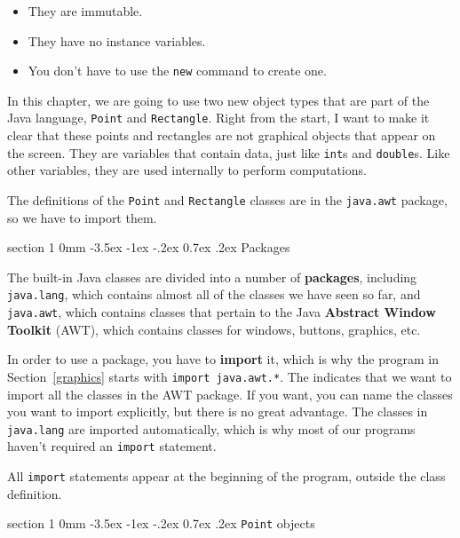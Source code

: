 \documentclass{book}
\makeatletter
\renewcommand{\section}{\@startsection 
    {section} {1} {0mm}%
    {-3.5ex \@plus -1ex \@minus -.2ex}%
    {0.7ex \@plus.2ex}%
    {\normalfont\Large\bfseries}}
\makeatother
\begin{document}
\begin{itemize}

\item They are immutable.

\item They have no instance variables.

\item You don't have to use the {\tt new} command to create one.

\end{itemize}

In this chapter, we are going to use two new object types that are
part of the Java language, {\tt Point} and {\tt Rectangle}.
Right from the start, I want to make it clear that these points
and rectangles are not graphical objects that appear on the
screen.  They are variables that contain data, just like {\tt int}s
and {\tt double}s.  Like other variables, they are used internally
to perform computations.

The definitions of the {\tt Point} and {\tt Rectangle} classes are
in the {\tt java.awt} package, so we have to import them.

\section{Packages}

The built-in Java classes are divided into a number of {\bf
packages}, including {\tt java.lang}, which contains almost all of the
classes we have seen so far, and {\tt java.awt}, which contains
classes that pertain to the Java {\bf Abstract Window Toolkit} (AWT),
which contains classes for windows, buttons, graphics, etc.

In order to use a package, you have to {\bf import} it, which is
why the program in Section~\ref{graphics} starts with {\tt import
java.awt.*}.  The {\tt *} indicates that we want to import all
the classes in the AWT package.  If you want, you can name the classes
you want to import explicitly, but there is no great advantage.  The
classes in {\tt java.lang} are imported automatically, which is why
most of our programs haven't required an {\tt import} statement.

All {\tt import} statements appear at the beginning of the program,
outside the class definition.

\section{{\tt Point} objects}
\end{document}
